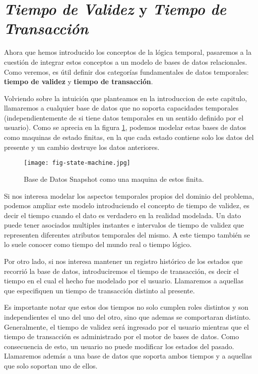 \section{\textit{Tiempo de Validez} y \textit{Tiempo de Transacción}} \label{sec:val:trans}

Ahora que hemos introducido los conceptos de la lógica temporal,
pasaremos a la cuestión de integrar estos conceptos a un modelo de bases de datos relacionales.
Como veremos, es útil definir dos categorías fundamentales de datos temporales:
\textbf{tiempo de validez} y \textbf{tiempo de transacción}.

Volviendo sobre la intuición que planteamos en la introduccion de este capitulo, llamaremos  a cualquier base de datos
que no soporta capacidades temporales (independientemente de si tiene datos temporales en un sentido definido por el usuario).
Como se aprecia en la figura \ref{fig:state-machine}, podemos modelar estas bases de datos como maquinas de estado finitas, en la que cada
estado contiene solo los datos del presente y un cambio destruye los datos anteriores.

\begin{figure}
    \centering
    \texttt{[image: fig-state-machine.jpg]}
    \caption{Base de Datos Snapshot como una maquina de estos finita.}
    \label{fig:state-machine}
\end{figure}

Si nos interesa modelar los aspectos temporales propios del dominio del problema,
podemos ampliar este modelo introduciendo el concepto de tiempo de validez,
es decir el tiempo cuando el dato es verdadero en la realidad modelada.
Un dato puede tener asociados multiples instantes e intervalos de tiempo de validez que representen diferentes atributos temporales del mismo.
A este tiempo también se lo suele conocer como tiempo del mundo real o tiempo lógico.

Por otro lado, si nos interesa mantener un registro histórico de los estados que recorrió la base de datos,
introduciremos el tiempo de transacción, es decir el tiempo en el cual el hecho fue modelado por el usuario.
Llamaremos  a aquellas que especifiquen un tiempo de transacción distinto al presente.

Es importante notar que estos dos tiempos no solo cumplen roles distintos y son independientes el uno del uno del otro,
sino que ademas se comportaran distinto.
Generalmente, el tiempo de validez será ingresado por el usuario mientras que
el tiempo de transacción es administrado por el motor de bases de datos.
Como consecuencia de esto, un usuario no puede modificar los estados del pasado.
Llamaremos además  a una base de datos que soporta ambos tiempos
y  a aquellas que solo soportan uno de ellos.

